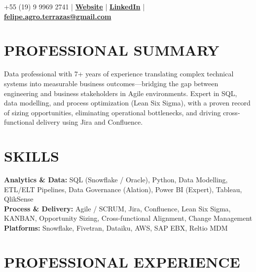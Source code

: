 \documentclass[9pt, letterpaper]{article}
\begin{document}
	\pagestyle{empty}

	 \hfill +55 (19) 9 9969 2741 | \href{https://feliperamiresterrazas.github.io/professionalwebsite/}{\textbf{Website}} | \href{https://www.linkedin.com/in/felipe-ramires-terrazas/}{\textbf{LinkedIn}} |
	\\
	 \hfill \href{mailto:felipe.agro.terrazas@gmail.com}{\textbf{felipe.agro.terrazas@gmail.com}}

	\section*{PROFESSIONAL SUMMARY}
	\noindent Data professional with 7+ years of experience translating complex technical systems into measurable business outcomes---bridging the gap between engineering and business stakeholders in Agile environments. Expert in SQL, data modelling, and process optimization (Lean Six Sigma), with a proven record of sizing opportunities, eliminating operational bottlenecks, and driving cross-functional delivery using Jira and Confluence.

	\section*{SKILLS}
	\noindent \textbf{Analytics \& Data:} SQL (Snowflake / Oracle), Python, Data Modelling, ETL/ELT Pipelines, Data Governance (Alation), Power BI (Expert), Tableau, QlikSense \\
	\noindent \textbf{Process \& Delivery:} Agile / SCRUM, Jira, Confluence, Lean Six Sigma, KANBAN, Opportunity Sizing, Cross-functional Alignment, Change Management \\
	\noindent \textbf{Platforms:} Snowflake, Fivetran, Dataiku, AWS, SAP EBX, Reltio MDM


	\section*{PROFESSIONAL EXPERIENCE}
\end{document}
